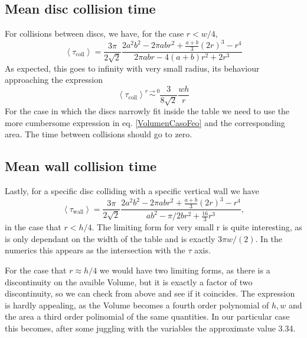 \documentclass[superscriptaddress,pre,reprint,showpacs,onecolumn]{revtex4-1}
\newcommand{\mean}[1]{\left \langle #1 \right \rangle}
\begin{document}
\subsection{Mean disc collision time}

For collisions between discs, we have, for the case $r<w/4$,
\begin{equation}\label{colltau}
 \mean{\tau_\text{coll}} = 	
\frac{3 \pi}{2\sqrt{2}}
\frac {2 a^{2} b^{2}  - 2 \pi a b r^{2} + \textstyle \frac{a+b}{3}  (2r)^{3}  -  r^4}
{2\pi a b r -4(a+b)r^2+2r^3}
\end{equation}
As expected, this goes to infinity with very small radius, its behaviour
approaching the expression
\begin{equation}\label{colltaulim0}
\mean{\tau_\text{coll}} \overset{r \to 0}{\sim}
\frac{3}{8\sqrt{2}}\frac{wh}{r}
\end{equation}
For the case in which the discs narrowly fit inside the table we need to
use the more cumbersome expression in eq. \ref{VolumenCasoFeo} and
the corresponding area. The time between collisions should go to zero.


\subsection{Mean wall collision time}

Lastly, for a specific disc colliding with a specific vertical wall we have
\begin{equation}\label{impactwall}
 \mean{\tau_\text{wall}} = 	
\frac{3 \pi}{2\sqrt{2}}
\frac { 2a^{2} b^{2}  -  2\pi a b r^{2} + \frac{a+b}{3}(2r)^3 - r^4}
{ab^2-\pi/2b r^2 + \frac{16}{3} r^3 },
\end{equation}
in the case that $r<h/4$. The limiting form for very small r is
quite interesting, as is only dependant on the width of the table and is exactly
$3\pi w/(2)$. In the numerics this appears as the intersection with the $\tau$
axis.

For the case that $r\approx h/4$ we would have two limiting forms,
as there is a discontinuity on the avaible Volume, but it is exactly
a factor of two discontinuity, so we can check from above and see
if it coincides. The expression is hardly appealing, as the Volume becomes
a fourth order polynomial of $h,w$ and the area a third order polinomial of
the same quantities. In our particular case this becomes,
after some juggling with the variables the approximate value 3.34. 


\end{document}
